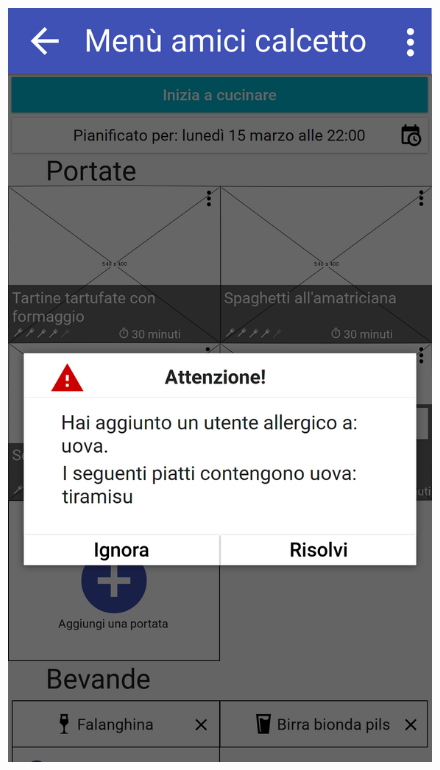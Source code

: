 \begin{figure}[H]
\begin{minipage}{.49\textwidth}
		\includegraphics[width=\textwidth]{img/wireframe/men_aggiunto_allergico.png}
	\end{minipage}
\end{figure}
